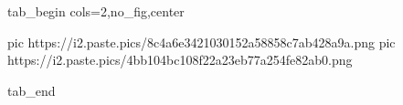  
 
 
 
 

\ifcmt
  tab_begin cols=2,no_fig,center

     pic https://i2.paste.pics/8c4a6e3421030152a58858c7ab428a9a.png
		 pic https://i2.paste.pics/4bb104bc108f22a23eb77a254fe82ab0.png

  tab_end
\fi
